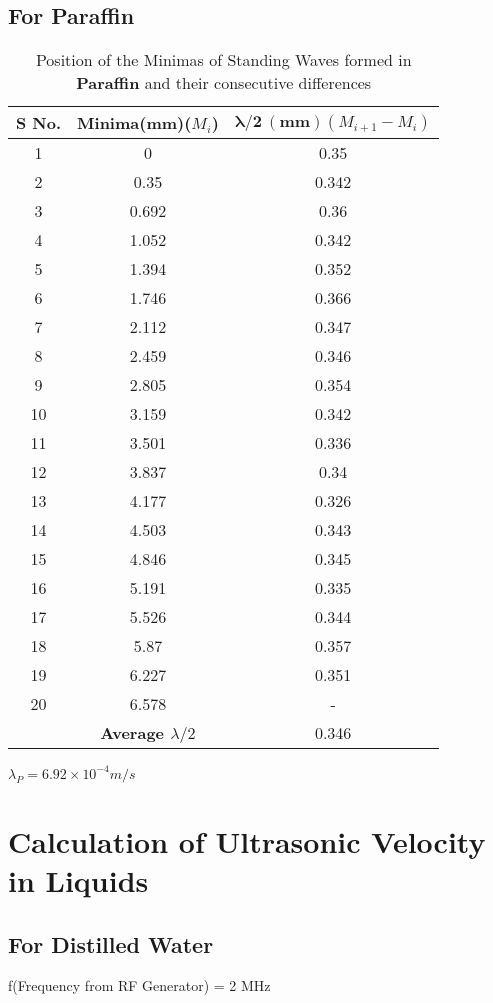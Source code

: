 \subsection{For Paraffin}
\begin{table}[H]
         \centering
        \begin{tabular}{|c|c|c|}
             \hline
        \textbf{S No.} & \textbf{Minima(mm)($M_i$)} & $\mathbf{\lambda/2\:(mm)}$$(M_{i+1}-M_i)$ \\
        \hline
        1 &	0&	0.35\\
        2&	0.35&	0.342\\
        3&	0.692&	0.36\\
        4&	1.052&	0.342\\
        5&	1.394&	0.352\\
        6&	1.746&	0.366\\
        7&	2.112&	0.347\\
        8&	2.459&	0.346\\
        9&	2.805&	0.354\\
        10&	3.159&	0.342\\
        11&	3.501&	0.336\\
        12&	3.837&	0.34\\
        13&	4.177&	0.326\\
        14&	4.503&	0.343\\
        15&	4.846&	0.345\\
        16&	5.191&	0.335\\
        17&	5.526&	0.344\\
        18&	5.87&	0.357\\
        19&	6.227&	0.351\\
        20&	6.578&	-\\
        \hline
        &\textbf{Average $\lambda/2$} & 0.346\\
        
        \hline
   
    \end{tabular}
         $\lambda_{P} = 6.92 \times 10^{-4} m/s$
    \caption{Position of the Minimas of Standing Waves formed in \textbf{Paraffin} and their consecutive differences}
    \end{table}


\pagebreak    
\section{Calculation of Ultrasonic Velocity in Liquids}
\subsection{For Distilled Water}
f(Frequency from RF Generator) = 2 MHz \\

